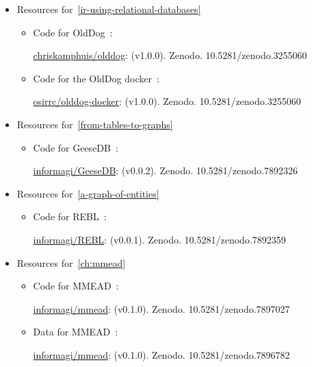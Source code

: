 \begin{itemize}
	\item Resources for~\cref{ir-using-relational-databases}
	\begin{itemize}
		\item Code for OldDog~\citep{olddog-docker}:
		
		\href{https://doi.org/10.5281/zenodo.7892260}{chriskamphuis/olddog}: (v1.0.0). Zenodo. 10.5281/zenodo.3255060
		
		\item Code for the OldDog docker~\citep{olddog-docker}:
		
		\href{https://doi.org/10.5281/zenodo.3255060}{osirrc/olddog-docker}: (v1.0.0). Zenodo. 10.5281/zenodo.3255060
	\end{itemize}
	
	\item Resources for~\cref{from-tables-to-graphs}
	\begin{itemize}
		\item Code for GeeseDB~\citep{geesedb}:
		
		\href{https://doi.org/10.5281/zenodo.7892326}{informagi/GeeseDB}: (v0.0.2). Zenodo. 10.5281/zenodo.7892326
	\end{itemize}
	
	\item Resources for~\cref{a-graph-of-entities}
	\begin{itemize}
		\item Code for REBL~\citep{rebl}:
		
		\href{https://doi.org/10.5281/zenodo.7892359}{informagi/REBL}: (v0.0.1). Zenodo. 10.5281/zenodo.7892359
	\end{itemize}
	
	\item Resources for~\cref{ch:mmead}
	\begin{itemize}
		\item Code for MMEAD~\citep{mmead}:
		
		\href{https://doi.org/10.5281/zenodo.7897027}{informagi/mmead}: (v0.1.0). Zenodo. 10.5281/zenodo.7897027
		
		\item Data for MMEAD~\citep{mmead}:
		
		\href{https://doi.org/10.5281/zenodo.7896782}{informagi/mmead}: (v0.1.0). Zenodo. 10.5281/zenodo.7896782
	\end{itemize}
	
\end{itemize}